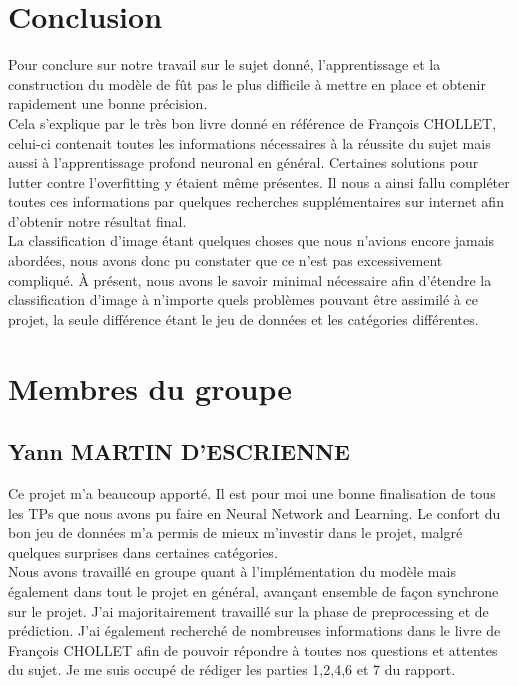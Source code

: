 \documentclass[12pt ,a4paper ]{article}
\begin{document}
\section{Conclusion}
Pour conclure sur notre travail sur le sujet donné, l'apprentissage et la construction du modèle de fût pas le plus difficile à mettre en place et obtenir rapidement une bonne précision. \\
Cela s'explique par le très bon livre donné en référence de François CHOLLET, celui-ci contenait toutes les informations nécessaires à la réussite du sujet mais aussi à l'apprentissage profond neuronal en général.  Certaines solutions pour lutter contre l'overfitting y étaient même présentes. Il nous a ainsi fallu compléter toutes ces informations par quelques recherches supplémentaires sur internet afin d'obtenir notre résultat final.\\
La classification d'image étant quelques choses que nous n'avions encore jamais abordées, nous avons donc pu constater que ce n'est pas excessivement compliqué. À présent, nous avons le savoir minimal nécessaire afin d'étendre la classification d'image à n'importe quels problèmes pouvant être assimilé à ce projet, la seule différence étant le jeu de données et les catégories différentes. 

\section{Membres du groupe}
\subsection{Yann MARTIN D'ESCRIENNE}
Ce projet m'a beaucoup apporté. Il est pour moi une bonne finalisation de tous les TPs que nous avons pu faire en Neural Network and Learning. Le confort du bon jeu de données m'a permis de mieux m'investir dans le projet, malgré quelques surprises dans certaines catégories.\\

Nous avons travaillé en groupe quant à l'implémentation du modèle mais également dans tout le projet en général, avançant ensemble de façon synchrone sur le projet. J'ai majoritairement travaillé sur la phase de preprocessing et de prédiction. J'ai également recherché de nombreuses informations dans le livre de François CHOLLET afin de pouvoir répondre à toutes nos questions et attentes du sujet. 
Je me suis occupé de rédiger les parties 1,2,4,6 et 7 du rapport. 
\end{document}
